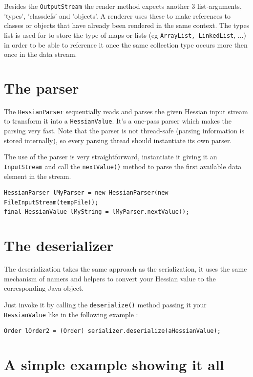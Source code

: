 \documentclass[a4paper]{article}
\begin{document}
Besides the \lstinline$OutputStream$ the render method expects another 3 list-arguments, 'types', 'classdefs' and 'objects'. A renderer uses these to make references to classes or objects that have already been rendered in the same context. The types list is used for to store the type of maps or lists (eg \lstinline$ArrayList, LinkedList$, ...) in order to be able to reference it once the same collection type occurs more then once in the data stream.

\section{The parser}

The \lstinline$HessianParser$ sequentially reads and parses the given Hessian input stream to transform it into a \lstinline$HessianValue$. It's a one-pass parser which makes the parsing very fast.  Note that the parser is not thread-safe (parsing information is stored internally), so every parsing thread should instantiate its own parser.

The use of the parser is very straightforward, instantiate it giving it an \lstinline$InputStream$ and call the \lstinline$nextValue()$ method to parse the first available data element in the stream. 

\medskip
\begin{lstlisting}
HessianParser lMyParser = new HessianParser(new FileInputStream(tempFile));
final HessianValue lMyString = lMyParser.nextValue();
\end{lstlisting}
\medskip

\section{The deserializer}

The deserialization takes the same approach as the serialization, it uses the same mechanism of namers and helpers to convert your Hessian value to the corresponding Java object.

Just invoke it by calling the \lstinline$deserialize()$ method passing it your \lstinline$HessianValue$ like in the following example :

\medskip
\begin{lstlisting}
Order lOrder2 = (Order) serializer.deserialize(aHessianValue);
\end{lstlisting}
\medskip

\section{A simple example showing it all}
\end{document}
